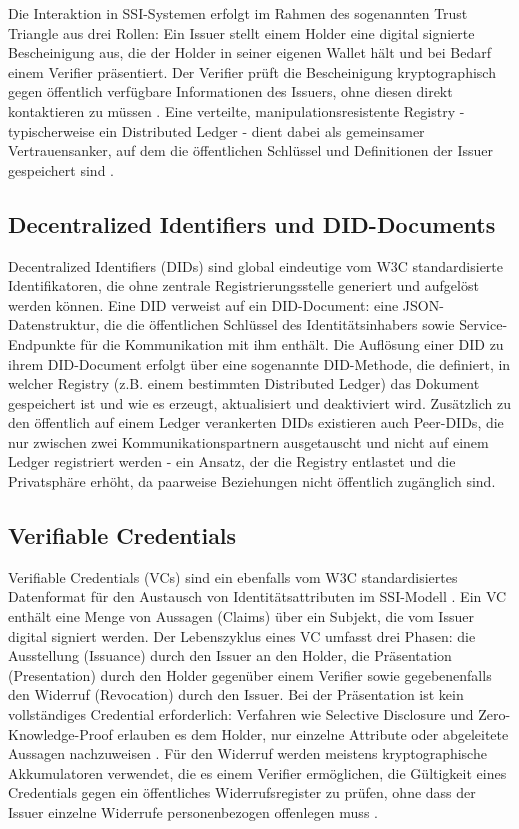 Die Interaktion in SSI-Systemen erfolgt im Rahmen des sogenannten Trust Triangle aus drei Rollen: Ein Issuer stellt einem Holder eine digital signierte Bescheinigung aus, die der Holder in seiner eigenen Wallet hält und bei Bedarf einem Verifier präsentiert. Der Verifier prüft die Bescheinigung kryptographisch gegen öffentlich verfügbare Informationen des Issuers, ohne diesen direkt kontaktieren zu müssen \cite{mazzocca2025}. Eine verteilte, manipulationsresistente Registry - typischerweise ein Distributed Ledger - dient dabei als gemeinsamer Vertrauensanker, auf dem die öffentlichen Schlüssel und Definitionen der Issuer gespeichert sind \cite{sovrin2018}.

\subsection{Decentralized Identifiers und DID-Documents}
Decentralized Identifiers (DIDs) sind global eindeutige vom W3C standardisierte Identifikatoren, die ohne zentrale Registrierungsstelle generiert und aufgelöst werden können. Eine DID verweist auf ein DID-Document: eine JSON-Datenstruktur, die die öffentlichen Schlüssel des Identitätsinhabers sowie Service-Endpunkte für die Kommunikation mit ihm enthält. Die Auflösung einer DID zu ihrem DID-Document erfolgt über eine sogenannte DID-Methode, die definiert, in welcher Registry (z.B. einem bestimmten Distributed Ledger) das Dokument gespeichert ist und wie es erzeugt, aktualisiert und deaktiviert wird. Zusätzlich zu den öffentlich auf einem Ledger verankerten DIDs existieren auch Peer-DIDs, die nur zwischen zwei Kommunikationspartnern ausgetauscht und nicht auf einem Ledger registriert werden - ein Ansatz, der die Registry entlastet und die Privatsphäre erhöht, da paarweise Beziehungen nicht öffentlich zugänglich sind. \cite{mazzocca2025}

\subsection{Verifiable Credentials}
Verifiable Credentials (VCs) sind ein ebenfalls vom W3C standardisiertes Datenformat für den Austausch von Identitätsattributen im SSI-Modell \cite{mazzocca2025}. Ein VC enthält eine Menge von Aussagen (Claims) über ein Subjekt, die vom Issuer digital signiert werden. Der Lebenszyklus eines VC umfasst drei Phasen: die Ausstellung (Issuance) durch den Issuer an den Holder, die Präsentation (Presentation) durch den Holder gegenüber einem Verifier sowie gegebenenfalls den Widerruf (Revocation) durch den Issuer. Bei der Präsentation ist kein vollständiges Credential erforderlich: Verfahren wie Selective Disclosure und Zero-Knowledge-Proof erlauben es dem Holder, nur einzelne Attribute oder abgeleitete Aussagen nachzuweisen \cite{mazzocca2025}. Für den Widerruf werden meistens kryptographische Akkumulatoren verwendet, die es einem Verifier ermöglichen, die Gültigkeit eines Credentials gegen ein öffentliches Widerrufsregister zu prüfen, ohne dass der Issuer einzelne Widerrufe personenbezogen offenlegen muss \cite{torongo2023}.

